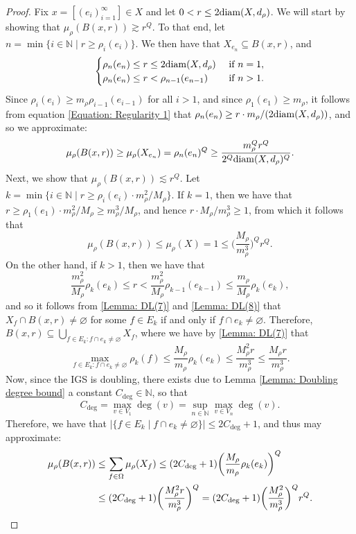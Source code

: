 \documentclass{amsart}
\newcommand{\diam}{{\rm diam}}
\newcommand{\degr}{{\rm deg}}
\numberwithin{equation}{section}
\theoremstyle{definition}
\theoremstyle{remark}
\newcommand{\N}{\mathbb{N}}
\begin{document}
\begin{proof}
Fix \(x=[(e_i)_{i=1}^\infty]\in X\) and let \(0<r\leq 2\diam(X,d_\rho)\). We will start by showing that \(\mu_\rho(B(x,r))\gtrsim r^Q\). To that end, let \(n=\min\{i\in\N\mid r\geq \rho_i(e_i)\}\). We then have that \(X_{e_n}\subseteq B(x,r)\), and
    \begin{equation}\label{Equation: Regularity 1}
    \begin{cases}
        \rho_n(e_n)\leq r \leq 2\diam(X,d_\rho)\ &\text{if }n=1,\\
        \rho_n(e_n)\leq r < \rho_{n-1}(e_{n-1}) &\text{if }n>1.
    \end{cases}
    \end{equation}
Since \(\rho_i(e_i)\geq m_\rho \rho_{i-1}(e_{i-1})\) for all \(i>1\), and since \(\rho_1(e_1)\geq m_\rho\), it follows from equation \eqref{Equation: Regularity 1} that \(\rho_n(e_n)\geq r\cdot m_\rho/(2\diam(X,d_\rho))\), and so we approximate:
    \[
        \mu_\rho(B(x,r))\geq \mu_\rho(X_{e_n})=\rho_n(e_n)^Q\geq\frac{m_\rho^Qr^Q}{2^Q\diam(X,d_\rho)^Q}.
    \]  
Next, we show that \(\mu_\rho(B(x,r))\lesssim  r^Q\). Let \(k=\min\{i\in\N\mid r\geq \rho_i(e_i)\cdot m_\rho^2 /M_\rho\}\). If \(k=1\), then we have that \(r\geq \rho_1(e_1)\cdot  m_\rho^2/M_\rho\geq m_\rho^3 /M_\rho\), and hence \(r\cdot M_\rho/m_\rho^3\geq 1\), from which it follows that 
    \[
    \mu_\rho(B(x,r))\leq \mu_\rho(X)=1\leq \bigg(\frac{M_\rho }{m_\rho^3}\bigg)^Qr^Q.
    \]
On the other hand, if \(k>1\), then we have that
    \[
        \frac{m_\rho^2}{M_\rho}\rho_k(e_k)\leq r <\frac{m_\rho^2}{M_\rho}\rho_{k-1}(e_{k-1})\leq \frac{m_\rho}{M_\rho} \rho_k(e_k),
    \]
and so it follows from \ref{Lemma: DL(7)} and \ref{Lemma: DL(8)} that \(X_{f}\cap B(x,r)\neq \varnothing\) for some \(f\in E_k \) if and only if \(f\cap e_k\neq \varnothing\). Therefore, \(B(x,r)\subseteq\bigcup_{f\in E_k:f\cap e_k\neq\varnothing}X_f\), where we have by \ref{Lemma: DL(7)} that 
    \[
        \max_{f\in E_k:f\cap e_k\neq \varnothing}\rho_k(f)\leq \frac{M_\rho}{m_\rho}\rho_k(e_k)\leq \frac{M_\rho^2r}{m_\rho^3} \leq \frac{M_\rho r}{m_\rho^3}.
    \]
Now, since the IGS is doubling, there exists due to Lemma \ref{Lemma: Doubling degree bound} a constant \(C_{\deg}\in\N\), so that
    \[
        C_{\deg}=\max_{v\in V_1}\deg(v)=\sup_{n\in\N}\max_{v\in V_n}\deg(v).
    \] 
Therefore, we have that \(\lvert\{f\in E_k\mid f\cap e_k\neq \varnothing\}\rvert\leq 2C_{\deg}+1\), and thus may approximate:
    \[
    \begin{split}
    \mu_\rho(B(x,r))&\leq \sum_{f\in\Omega}\mu_\rho(X_f)\leq (2C_\degr +1)\bigg(\frac{M_\rho}{m_\rho}\rho_k(e_k)\bigg)^Q\\
    &\leq (2C_\degr +1)\bigg(\frac{M_\rho^2 r}{m_\rho^3}\bigg)^Q=(2C_\degr +1)\bigg(\frac{M_\rho^2}{m_\rho^3}\bigg)^Qr^Q.
    \end{split}
    \]
\end{proof}
\end{document}
